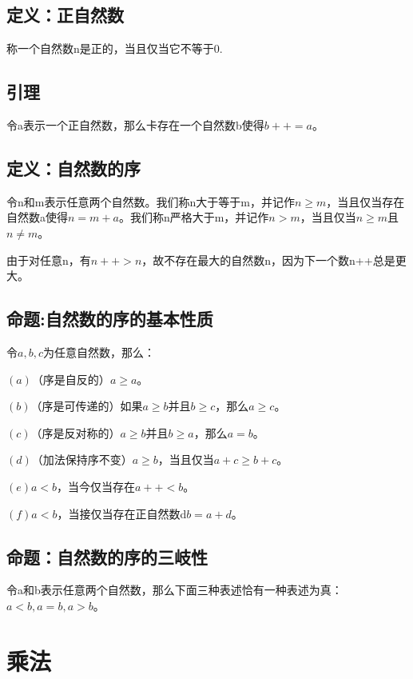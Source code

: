 \documentclass{article}
\begin{document}
\subsection{定义：正自然数}
称一个自然数n是正的，当且仅当它不等于0.

\subsection{引理}
令a表示一个正自然数，那么卡存在一个自然数b使得$ b++=a $。

\subsection{定义：自然数的序}
令n和m表示任意两个自然数。我们称n大于等于m，并记作$ n\ge m $，当且仅当存在自然数a使得$ n=m+a $。我们称n严格大于m，并记作$ n>m $，当且仅当$ n\ge m $且$ n\ne m $。
\\ \hspace*{\fill}

由于对任意n，有$ n++>n $，故不存在最大的自然数n，因为下一个数n++总是更大。

\subsection{命题:自然数的序的基本性质}
令$ a,b,c $为任意自然数，那么：

$ (a) $\qquad （序是自反的）$ a\ge a $。

$ (b) $\qquad （序是可传递的）如果$ a\ge b $并且$ b\ge c $，那么$ a\ge c $。

$ (c) $\qquad （序是反对称的）$ a\ge b $并且$ b\ge a $，那么$ a=b $。

$ (d) $\qquad （加法保持序不变）$ a\ge b $，当且仅当$ a+c\ge b+c $。

$ (e) $\qquad $ a<b $，当今仅当存在$ a++<b $。

$ (f) $\qquad $ a<b $，当接仅当存在正自然数d$ b=a+d $。

\subsection{命题：自然数的序的三岐性}
令a和b表示任意两个自然数，那么下面三种表述恰有一种表述为真：
$ a<b,a=b,a>b $。


\section{乘法}
\end{document}
